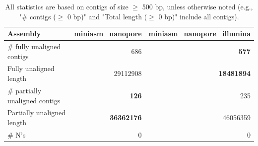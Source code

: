 \documentclass[12pt,a4paper]{article}
\begin{document}
\begin{table}[ht]
\begin{center}
\caption{All statistics are based on contigs of size $\geq$ 500 bp, unless otherwise noted (e.g., "\# contigs ($\geq$ 0 bp)" and "Total length ($\geq$ 0 bp)" include all contigs).}
\begin{tabular}{|l*{2}{|r}|}
\hline
Assembly & miniasm\_nanopore & miniasm\_nanopore\_illumina \\ \hline
\# fully unaligned contigs & 686 & {\bf 577} \\ \hline
Fully unaligned length & 29112908 & {\bf 18481894} \\ \hline
\# partially unaligned contigs & {\bf 126} & 235 \\ \hline
Partially unaligned length & {\bf 36362176} & 46056359 \\ \hline
\# N's & 0 & 0 \\ \hline
\end{tabular}
\end{center}
\end{table}
\end{document}
